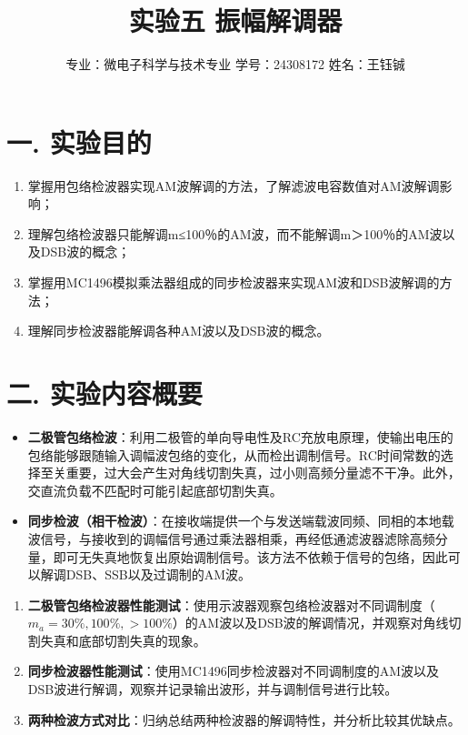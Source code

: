 \documentclass[12pt]{article}
\title{\Huge \textbf{实验五 \quad 振幅解调器}}
\author{专业：微电子科学与技术专业 \quad 学号：24308172 \quad 姓名：王钰铖}
\date{}
\begin{document}
\maketitle

\section*{一. 实验目的}
\begin{enumerate}
    \item 掌握用包络检波器实现AM波解调的方法，了解滤波电容数值对AM波解调影响；
    \item 理解包络检波器只能解调m≤100％的AM波，而不能解调m＞100％的AM波以及DSB波的概念；
    \item 掌握用MC1496模拟乘法器组成的同步检波器来实现AM波和DSB波解调的方法；
    \item 理解同步检波器能解调各种AM波以及DSB波的概念。
\end{enumerate}

\section*{二. 实验内容概要}

\vspace{1em}


\begin{itemize}
    \item \textbf{二极管包络检波}：利用二极管的单向导电性及RC充放电原理，使输出电压的包络能够跟随输入调幅波包络的变化，从而检出调制信号。RC时间常数的选择至关重要，过大会产生对角线切割失真，过小则高频分量滤不干净。此外，交直流负载不匹配时可能引起底部切割失真。
    \item \textbf{同步检波（相干检波）}：在接收端提供一个与发送端载波同频、同相的本地载波信号，与接收到的调幅信号通过乘法器相乘，再经低通滤波器滤除高频分量，即可无失真地恢复出原始调制信号。该方法不依赖于信号的包络，因此可以解调DSB、SSB以及过调制的AM波。
\end{itemize}

\vspace{1em}


\begin{enumerate}
    \item[(1)] \textbf{二极管包络检波器性能测试}：使用示波器观察包络检波器对不同调制度（$m_a=30\%, 100\%, >100\%$）的AM波以及DSB波的解调情况，并观察对角线切割失真和底部切割失真的现象。
    \item[(2)] \textbf{同步检波器性能测试}：使用MC1496同步检波器对不同调制度的AM波以及DSB波进行解调，观察并记录输出波形，并与调制信号进行比较。
    \item[(3)] \textbf{两种检波方式对比}：归纳总结两种检波器的解调特性，并分析比较其优缺点。
\end{enumerate}
\end{document}
